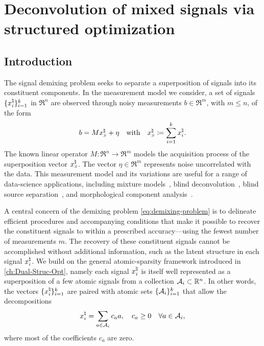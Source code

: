 \chapter{Deconvolution of mixed signals via structured optimization}
\label{ch:App-Sig-Demix}

\section{Introduction} 

The signal demixing problem seeks to separate a superposition of signals into its constituent components. In the measurement model we consider, a set of signals $\{x_i^{\natural}\}_{i=1}^k$ in $\Re^n$ are observed through noisy
measurements $b\in\Re^m$, with $m\le n$, of the form
\begin{equation}\label{eq:demixing-problem}
  b = Mx_{\scriptscriptstyle S}^\natural + \eta \hbox{\quad with\quad} x_{\scriptscriptstyle S}^\natural\coloneqq \sum\limits_{i = 1}^k x_i^{\natural}.
\end{equation}
The known linear operator $M:\Re^n \rightarrow \Re^m$ models the acquisition process of the superposition vector $x_{\scriptscriptstyle S}^\natural$. The vector $\eta\in \Re^m$ represents noise uncorrelated with the data. This measurement model and its variations are useful for a range of data-science applications, including mixture models~\cite{araki2009blind,quiros2012dependent}, blind deconvolution~\cite{ahmed2013blind}, blind source separation~\cite{chan2008convex}, and morphological component analysis~\cite{bobin2007morphological}.

A central concern of the demixing problem \eqref{eq:demixing-problem} is to delineate efficient procedures and accompanying conditions that make it possible to recover the constituent signals to within a prescribed accuracy---using the fewest number of measurements $m$. The recovery of these constituent signals cannot be accomplished without additional information, such as the latent structure in each signal $x_i^{\natural}$. We build on the general atomic-sparsity framework introduced in \autoref{ch:Dual-Struc-Opt}, namely each signal $x_i^{\natural}$ is itself well represented as a superposition of a few atomic signals from a collection  $\mathcal{A}_i\subset\mathbb{R}^n$. In other words, the vectors $\{x_i^{\natural}\}_{i=1}^k$ are paired with atomic sets $\{\mathcal{A}_i\}_{i=1}^k$ that allow the decompositions
\begin{equation} \label{eq:decomposition}
  x_i^{\natural} = \sum_{a\in \mathcal{A}_i}c_a a, \quad c_a\geq 0\quad \forall a \in \mathcal{A}_i,
\end{equation}
where most of the coefficients $c_a$ are zero.

